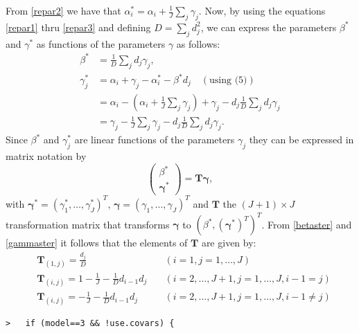 \documentclass[a4paper]{article}
\begin{document}
From \eqref{repar2} we have that $\alpha^*_i=\alpha_i+\frac{1}{J}\sum_j\gamma_j$.
Now, by using the equations \eqref{repar1} thru \eqref{repar3} and defining
$D=\sum_jd^2_j$, we can express the parameters $\beta^*$ and $\gamma^*$ as
functions of the parameters $\gamma$ as follows:
\begin{align}
  \label{betaster}
  \beta^* &=\frac{1}{D}\sum_jd_j\gamma_j,\\ \nonumber
  \label{gammaster}
  \gamma^*_j &= \alpha_i+\gamma_j-\alpha^*_i-\beta^*d_j  \quad (\text{using (5)})\\ \nonumber
  &=\alpha_i-\left( \alpha_i+\frac{1}{J}\sum_j\gamma_j\right) +\gamma_j-d_j\frac{1}{D}\sum_jd_j\gamma_j \\
  &=\gamma_j-\frac{1}{J}\sum_j\gamma_j-d_j\frac{1}{D}\sum_jd_j\gamma_j.
\end{align}
Since $\beta^*$ and $\gamma^*_j$ are linear functions of the parameters $\gamma_j$
they can be expressed in matrix notation by
\begin{equation}
  \left ( \begin{array} {c}
         \beta^* \\
         \boldsymbol{\gamma}^*
  \end{array} \right ) = \mathbf{T}\boldsymbol{\gamma},
\end{equation}
with $\boldsymbol{\gamma}^*=(\gamma^*_1,\ldots,\gamma^*_J)^T$,
$\boldsymbol{\gamma}=(\gamma_1,\ldots,\gamma_J)^T$ and $\mathbf{T}$
the $(J+1) \times J$ transformation matrix that transforms
$\boldsymbol{\gamma}$ to  $\left (\beta^*,(\boldsymbol{\gamma}^*)^T\right)^T$.
From \eqref{betaster} and \eqref{gammaster} it follows that the elements of
$\mathbf{T}$ are given by:
\begin{align}
  \label{matrixT} \nonumber
  &\mathbf{T}_{(1,j)}=\frac{d_j}{D} &\quad (i=1,j=1,\ldots,J)\\ \nonumber
  &\mathbf{T}_{(i,j)}=1-\frac{1}{J}-\frac{1}{D}d_{i-1}d_j &\quad(i=2,\ldots,J+1,j=1,\ldots,J,i-1=j)\\ \nonumber
  &\mathbf{T}_{(i,j)}=-\frac{1}{J}-\frac{1}{D}d_{i-1}d_j &\quad(i=2,\ldots,J+1,j=1,\ldots,J,i-1 \neq j)
\end{align}\par

\verb~>   if (model==3 && !use.covars) {~\par
\end{document}

